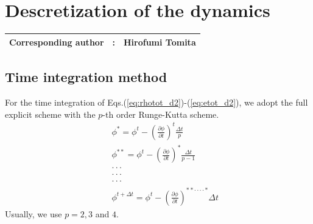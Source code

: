 \chapter{Descretization of the dynamics}
{\bf \Large 
\begin{tabular}{ccc}
\hline
  Corresponding author & : & Hirofumi Tomita\\
\hline
\end{tabular}
}

\section{Time integration method}

For the time integration of Eqs.(\ref{eq:rhotot_d2})-(\ref{eq:etot_d2}),
we adopt the full explicit scheme with
the $p$-th order Runge-Kutta scheme.
\begin{eqnarray}
&&  \phi^{*} = \phi^{t} - \left(\frac{\partial \phi}{\partial t}\right)^{t}\frac{\Delta t}{p}\\
&&  \phi^{**} = \phi^{t} - \left(\frac{\partial \phi}{\partial t}\right)^{*}\frac{\Delta t}{p-1}\\
&&  \cdot \cdot \cdot\nonumber\\
&&  \cdot \cdot \cdot\nonumber\\
&&  \cdot \cdot \cdot\nonumber\\
&&  \phi^{t+\Delta t} = \phi^{t} - \left(\frac{\partial \phi}{\partial t}\right)^{**\cdot\cdot\cdot\cdot*} \Delta t
\end{eqnarray}
Usually, we use $p=2,3$ and $4$.


